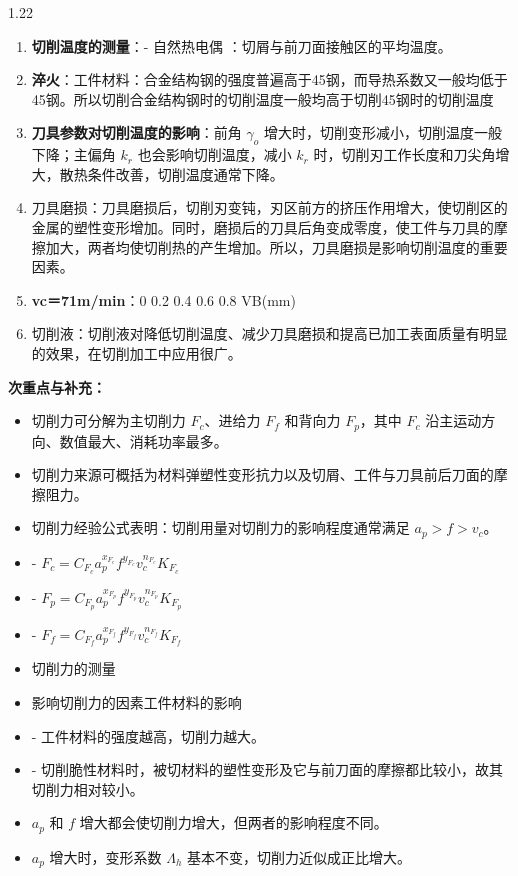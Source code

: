 \documentclass[12pt,a4paper]{article}
\begin{document}
\begin{spacing}{1.22}
\begin{tcolorbox}[colback=yellow!6,colframe=red!55!black,title=重点,left=1mm,right=1mm]
\begin{enumerate}[leftmargin=2.2em,label=\arabic*.]
  \item \textbf{切削温度的测量}：- 自然热电偶 ：切屑与前刀面接触区的平均温度。
  \item \textbf{淬火}：工件材料：合金结构钢的强度普遍高于45钢，而导热系数又一般均低于45钢。所以切削合金结构钢时的切削温度一般均高于切削45钢时的切削温度
  \item \textbf{刀具参数对切削温度的影响}：前角 $\gamma_o$ 增大时，切削变形减小，切削温度一般下降；主偏角 $k_r$ 也会影响切削温度，减小 $k_r$ 时，切削刃工作长度和刀尖角增大，散热条件改善，切削温度通常下降。
  \item 刀具磨损：刀具磨损后，切削刃变钝，刃区前方的挤压作用增大，使切削区的金属的塑性变形增加。同时，磨损后的刀具后角变成零度，使工件与刀具的摩擦加大，两者均使切削热的产生增加。所以，刀具磨损是影响切削温度的重要因素。
  \item \textbf{vc＝71m/min}：0 0.2 0.4 0.6 0.8 VB(mm)
  \item 切削液：切削液对降低切削温度、减少刀具磨损和提高已加工表面质量有明显的效果，在切削加工中应用很广。
\end{enumerate}
\end{tcolorbox}
\noindent\textbf{次重点与补充：}
\begin{itemize}[leftmargin=2.2em,label=--]
  \item 切削力可分解为主切削力 $F_c$、进给力 $F_f$ 和背向力 $F_p$，其中 $F_c$ 沿主运动方向、数值最大、消耗功率最多。
  \item 切削力来源可概括为材料弹塑性变形抗力以及切屑、工件与刀具前后刀面的摩擦阻力。
  \item 切削力经验公式表明：切削用量对切削力的影响程度通常满足 $a_p > f > v_c$。
  \item - $F_c = C_{F_c} a_p^{x_{F_c}} f^{y_{F_c}} v_c^{n_{F_c}} K_{F_c}$
  \item - $F_p = C_{F_p} a_p^{x_{F_p}} f^{y_{F_p}} v_c^{n_{F_p}} K_{F_p}$
  \item - $F_f = C_{F_f} a_p^{x_{F_f}} f^{y_{F_f}} v_c^{n_{F_f}} K_{F_f}$
  \item 切削力的测量
  \item 影响切削力的因素工件材料的影响
  \item - 工件材料的强度越高，切削力越大。
  \item - 切削脆性材料时，被切材料的塑性变形及它与前刀面的摩擦都比较小，故其切削力相对较小。
  \item $a_p$ 和 $f$ 增大都会使切削力增大，但两者的影响程度不同。
  \item $a_p$ 增大时，变形系数 $\Lambda_h$ 基本不变，切削力近似成正比增大。

\end{itemize}
\end{spacing}
\end{document}
